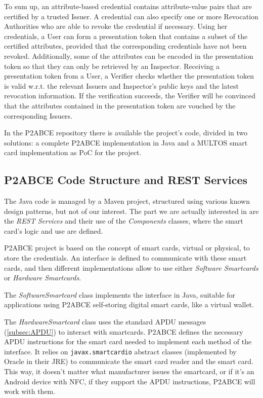 To sum up, an attribute-based credential contains attribute-value pairs that are certified by a trusted Issuer. A credential can also specify one or more Revocation Authorities who are able to revoke the credential if necessary. Using her credentials, a User can form a presentation token that contains a subset of the certified attributes, provided that the corresponding credentials have not been revoked. Additionally, some of the attributes can be encoded in the presentation token so that they can only be retrieved by an Inspector. Receiving a presentation token from a User, a Verifier checks whether the presentation token is valid w.r.t. the relevant Issuers and Inspector's public keys and the latest revocation information. If the verification succeeds, the Verifier will be convinced that the attributes contained in the presentation token are vouched by the corresponding Issuers.


\hfil

In the P2ABCE repository \citep{p2abcurl} there is available the project's code, divided in two solutions: a complete P2ABCE implementation in Java and a MULTOS smart card implementation as PoC for the project.

\subsection{P2ABCE Code Structure and REST Services}

The Java code is managed by a Maven project, structured using various known design patterns, but not of our interest. The part we are actually interested in are the \textit{REST Services} and their use of the \textit{Components} classes, where the smart card's logic and use are defined.

P2ABCE project is based on the concept of smart cards, virtual or physical, to store the credentials. An interface is defined to communicate with these smart cards, and then different implementations allow to use either \textit{Software Smartcards} or \textit{Hardware Smartcards}. 

The \textit{SoftwareSmartcard} class implements the interface in Java, suitable for applications using P2ABCE self-storing digital smart cards, like a virtual wallet.

The \textit{HardwareSmartcard} class uses the standard APDU messages (\ref{subsec:APDU}) to interact with smartcards. P2ABCE defines the necessary APDU instructions for the smart card needed to implement each method of the interface. It relies on \texttt{javax.smartcardio} abstract classes (implemented by Oracle in their JRE) to communicate the smart card reader and the smart card. This way, it doesn't matter what manufacturer issues the smartcard, or if it's an Android device with NFC, if they support the APDU instructions, P2ABCE will work with them.

